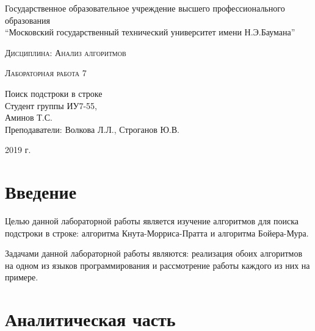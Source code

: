 \documentclass[a4paper, 14pt]{article}
\begin{document}
    \begin{titlepage}

        \begin{center}
            \large
            Государственное образовательное учреждение высшего профессионального образования\\
            “Московский государственный технический университет имени Н.Э.Баумана”
            \vspace{3cm}
            
            \textsc{Дисциплина: Анализ алгоритмов}
            \vspace{0.5cm}
                
            \textsc{Лабораторная работа 7}
            \vspace{1.5cm}
            
            {\LARGE Поиск подстроки в строке\\}
            \vspace{1.5cm}
            Студент группы ИУ7-55,\\   
            Аминов Т.С.\\
            Преподаватели: Волкова Л.Л., Строганов Ю.В.
            \vfill
            
            2019 г.
            
            \end{center}

    \end{titlepage}
    \setcounter{page}{2}
\tableofcontents
	
	\newpage
	
        \section*{Введение}
        
        
        \parindent=1cm
        
        
        Целью данной лабораторной работы является изучение алгоритмов для поиска подстроки в строке: алгоритма Кнута-Морриса-Пратта и алгоритма Бойера-Мура.
        
		Задачами данной лабораторной работы являются: реализация обоих алгоритмов на одном из языков программирования и рассмотрение работы каждого из них на примере.
        \label{sec:intro}

    	\newpage
        \section{Аналитическая часть}
		\parindent=1cm
		
\end{document}
